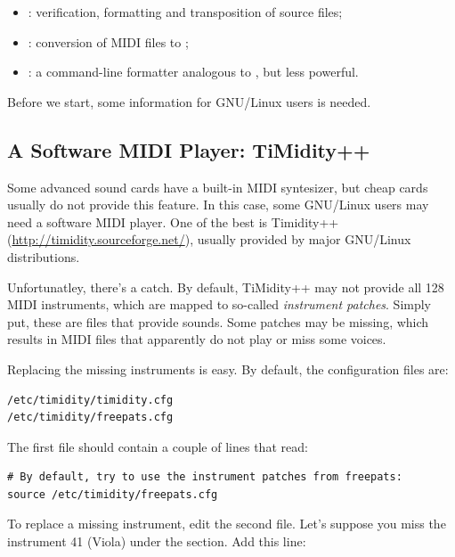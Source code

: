 \documentclass[a4paper,fullpage,12pt]{book}
\begin{document}
\begin{itemize}
  
  \item {}: verification, formatting and transposition of
  \ABC{} source files;
  
  \item {}: conversion of MIDI files to \ABC;
  
  \item {}: a command-line formatter analogous to \abcm, but
  less powerful.
  
  
\end{itemize}

Before we start, some information for GNU/Linux users is needed.


\subsection{A Software MIDI Player: TiMidity++}

Some advanced sound cards have a built-in MIDI syntesizer, but cheap
cards usually do not provide this feature. In this case, some 
GNU/Linux users may need a software MIDI player. One of the best is
Timidity++ (\url{http://timidity.sourceforge.net/}), usually provided
by major GNU/Linux distributions. 

Unfortunatley, there's a catch. By default, TiMidity++ may not provide
all 128 MIDI instruments, which are mapped to so-called
\emph{instrument patches}. Simply put, these are files that provide
sounds. Some patches may be missing, which results in MIDI files that
apparently do not play or miss some voices.

Replacing the missing instruments is easy. By default, the
configuration files are:

\begin{verbatim}
/etc/timidity/timidity.cfg
/etc/timidity/freepats.cfg
\end{verbatim}

The first file should contain a couple of lines that read:

\begin{verbatim}
# By default, try to use the instrument patches from freepats:
source /etc/timidity/freepats.cfg
\end{verbatim}

To replace a missing instrument, edit the second file. Let's suppose
you miss the instrument 41 (Viola) under the  section.
Add this line:
\end{document}

